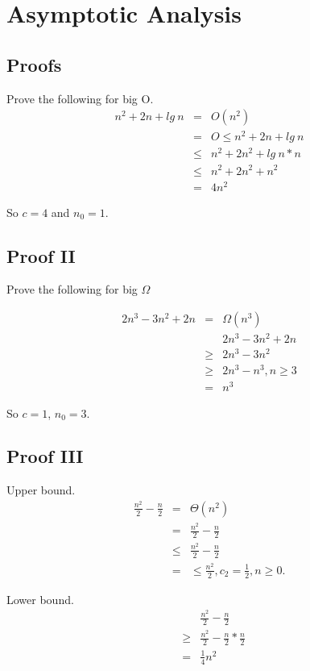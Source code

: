 \documentclass{article}
\begin{document}
\setcounter{section}{1}
\section{Asymptotic Analysis}

\subsection{Proofs}
Prove the following for big O.
\begin{eqnarray}
n^2 + 2n + lg \ n & = & O(n^2) \\
& = & O \leq n^2 +  2n + lg \ n \\
& \leq & n^2 + 2n^2 + lg \ n * n \\
& \leq & n^2 + 2n^2 + n^2 \\
& = & 4 n^2
\end{eqnarray}

So $c = 4$ and $n_0 = 1$.

\subsection{Proof II}
Prove the following for big $\Omega$

\begin{eqnarray}
2n^3 - 3n^2 + 2n & = & \Omega (n^3) \\
& & 2n ^3 - 3n^2 + 2n \\
& \geq &  2n^3 - 3n^2 \\
& \geq & 2n^3 - n^3, n \geq 3 \\
& = & n^3
\end{eqnarray}

So $c = 1$, $n_0 = 3$.

\subsection{Proof III}
Upper bound.
\begin{eqnarray}
\frac{n^2}{2} - \frac{n}{2} & = & \Theta (n^2) \\
& = & \frac{n^2}{2} - \frac{n}{2} \\
& \leq & \frac{n^2}{2} - \frac{n}{2} \\
& = & \leq \frac{n^2}{2}, c_2 = \frac{1}{2}, n \geq 0.
\end{eqnarray}

Lower bound.
\begin{eqnarray}
& & \frac{n^2}{2} - \frac{n}{2} \\
& \geq & \frac{n^2}{2} - \frac{n}{2} * \frac{n}{2} \\
& = & \frac{1}{4}n^2
\end{eqnarray}
\end{document}
